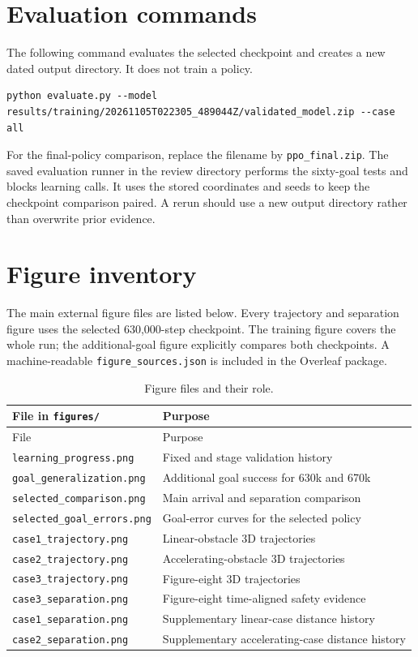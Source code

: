 \section{Evaluation commands}
The following command evaluates the selected checkpoint and creates a new dated output directory. It does not train a policy.
\begin{lstlisting}[language={},caption={Evaluate the selected policy on all three scenarios.}]
python evaluate.py --model results/training/20261105T022305_489044Z/validated_model.zip --case all
\end{lstlisting}
For the final-policy comparison, replace the filename by \texttt{ppo\_final.zip}. The saved evaluation runner in the review directory performs the sixty-goal tests and blocks learning calls. It uses the stored coordinates and seeds to keep the checkpoint comparison paired. A rerun should use a new output directory rather than overwrite prior evidence.

\section{Figure inventory}
The main external figure files are listed below. Every trajectory and separation figure uses the selected 630,000-step checkpoint. The training figure covers the whole run; the additional-goal figure explicitly compares both checkpoints. A machine-readable \texttt{figure\_sources.json} is included in the Overleaf package.

\begin{longtable}{p{}p{}}
\caption{Figure files and their role.}\label{tab:figures}\\
\toprule File in \texttt{figures/} & Purpose\\\midrule\endfirsthead
\toprule File & Purpose\\\midrule\endhead
\texttt{learning\_progress.png} & Fixed and stage validation history\\
\texttt{goal\_generalization.png} & Additional goal success for 630k and 670k\\
\texttt{selected\_comparison.png} & Main arrival and separation comparison\\
\texttt{selected\_goal\_errors.png} & Goal-error curves for the selected policy\\
\texttt{case1\_trajectory.png} & Linear-obstacle 3D trajectories\\
\texttt{case2\_trajectory.png} & Accelerating-obstacle 3D trajectories\\
\texttt{case3\_trajectory.png} & Figure-eight 3D trajectories\\
\texttt{case3\_separation.png} & Figure-eight time-aligned safety evidence\\
\texttt{case1\_separation.png} & Supplementary linear-case distance history\\
\texttt{case2\_separation.png} & Supplementary accelerating-case distance history\\\bottomrule
\end{longtable}

